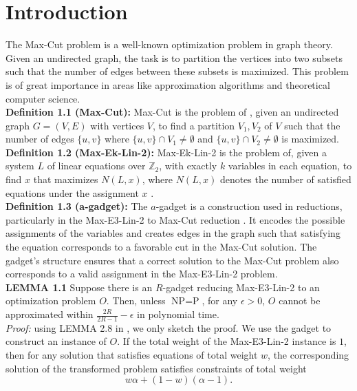 \documentclass[12pt]{article}
\begin{document}
\section{Introduction}
The Max-Cut problem is a well-known optimization problem in graph theory. Given an undirected graph, the task is to partition the vertices into two subsets such that the number of edges between these subsets is maximized. This problem is of great importance in areas like approximation algorithms and theoretical computer science. \\
\textbf{Definition 1.1 (Max-Cut):} 
Max-Cut is the problem of \cite{hastad2001optimal}, given an undirected graph \( G = (V, E) \) with vertices \( V \), to find a partition \( V_1, V_2 \) of \( V \) such that the number of edges \( \{u, v\} \) where \( \{u, v\} \cap V_1 \neq \emptyset \) and \( \{u, v\} \cap V_2 \neq \emptyset \) is maximized.\\
\textbf{Definition 1.2 (Max-Ek-Lin-2):} 
Max-Ek-Lin-2 is the problem of, given a system \( L \) of linear equations over \( \mathbb{Z}_2 \), with exactly \( k \) variables in each equation, to find \( x \) that maximizes \( N(L, x) \), where \( N(L, x) \) denotes the number of satisfied equations under the assignment \( x \) \cite{hastad2001optimal}.\\
\textbf{Definition 1.3 (a-gadget):} 
The \( a \)-gadget is a construction used in reductions, particularly in the Max-E3-Lin-2 to Max-Cut reduction \cite{trevisan2000gadgets}. It encodes the possible assignments of the variables and creates edges in the graph such that satisfying the equation corresponds to a favorable cut in the Max-Cut solution. The gadget's structure ensures that a correct solution to the Max-Cut problem also corresponds to a valid assignment in the Max-E3-Lin-2 problem.\\
\textbf{LEMMA 1.1} Suppose there is an \( R \)-gadget reducing Max-E3-Lin-2 to an optimization problem \( O \). Then, unless \( \text{NP} = \text{P} \), for any \( \epsilon > 0 \), \( O \) cannot be approximated within \( \frac{2R}{2R - 1} - \epsilon \) in polynomial time.\\
\textit{Proof:} using LEMMA 2.8 in \cite{trevisan2000gadgets}, we only sketch the proof. 
We use the gadget to construct an instance of \( O \). If the total weight of the Max-E3-Lin-2 instance is \( 1 \), then for any solution that satisfies equations of total weight \( w \), the corresponding solution of the transformed problem satisfies constraints of total weight 
\[
w \alpha + (1 - w)(\alpha - 1).
\]
\end{document}
